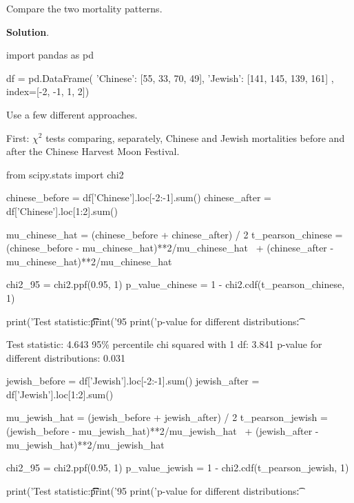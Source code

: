 Compare the two mortality patterns.

\textbf{Solution}.

\begin{python}
import pandas as pd

df = pd.DataFrame({
    'Chinese': [55, 33, 70, 49],
    'Jewish':  [141, 145, 139, 161]
}, index=[-2, -1, 1, 2])
\end{python}

Use a few different approaches.

First: \(\chi^{2}\) tests comparing, separately, Chinese and Jewish
mortalities before and after the Chinese Harvest Moon Festival.

\begin{python}
from scipy.stats import chi2

chinese_before = df['Chinese'].loc[-2:-1].sum()
chinese_after = df['Chinese'].loc[1:2].sum()

mu_chinese_hat = (chinese_before + chinese_after) / 2
t_pearson_chinese = (chinese_before - mu_chinese_hat)**2/mu_chinese_hat \
    + (chinese_after - mu_chinese_hat)**2/mu_chinese_hat

chi2_95 = chi2.ppf(0.95, 1)
p_value_chinese = 1 - chi2.cdf(t_pearson_chinese, 1)

print('Test statistic:\t\t\t\t%
print('95%
print('p-value for different distributions:\t%
\end{python}

\begin{console}
Test statistic:                         4.643
95\% percentile chi squared with 1 df:   3.841
p-value for different distributions:    0.031
\end{console}

\begin{python}
jewish_before = df['Jewish'].loc[-2:-1].sum()
jewish_after = df['Jewish'].loc[1:2].sum()

mu_{j}ewish_hat = (jewish_before + jewish_after) / 2
t_pearson_{j}ewish = (jewish_before - mu_{j}ewish_hat)**2/mu_{j}ewish_hat \
    + (jewish_after - mu_{j}ewish_hat)**2/mu_{j}ewish_hat

chi2_95 = chi2.ppf(0.95, 1)
p_value_{j}ewish = 1 - chi2.cdf(t_pearson_{j}ewish, 1)

print('Test statistic:\t\t\t\t%
print('95%
print('p-value for different distributions:\t%
\end{python}

